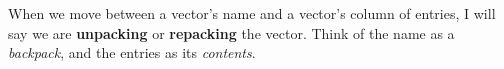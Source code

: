 %

When we move between a vector's name and a vector's column of entries, I will say we are \textbf{unpacking} or \textbf{repacking} the vector.  
Think of the name as a \textit{backpack}, and the entries as its \textit{contents}.


%

